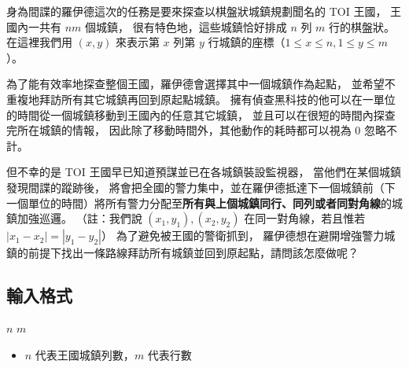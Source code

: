 身為間諜的羅伊德這次的任務是要來探查以棋盤狀城鎮規劃聞名的 TOI 王國，
王國內一共有 \begin{math}nm\end{math} 個城鎮，
很有特色地，這些城鎮恰好排成 \begin{math}n\end{math} 列
\begin{math}m\end{math} 行的棋盤狀。 在這裡我們用
\begin{math}(x, y)\end{math} 來表示第 \begin{math}x\end{math} 列第
\begin{math}y\end{math}
行城鎮的座標（\begin{math}1 \le x \le n, 1 \le y \le m\end{math}）。

為了能有效率地探查整個王國，羅伊德會選擇其中一個城鎮作為起點，
並希望不重複地拜訪所有其它城鎮再回到原起點城鎮。
擁有偵查黑科技的他可以在一單位的時間從一個城鎮移動到王國內的任意其它城鎮，
並且可以在很短的時間內探查完所在城鎮的情報，
因此除了移動時間外，其他動作的耗時都可以視為 \begin{math}0\end{math}
忽略不計。

但不幸的是 TOI 王國早已知道預謀並已在各城鎮裝設監視器，
當他們在某個城鎮發現間諜的蹤跡後，
將會把全國的警力集中，並在羅伊德抵達下一個城鎮前（下一個單位的時間）將所有警力分配至\textbf{所有與上個城鎮同行、同列或者同對角線}的城鎮加強巡邏。
（註：我們說 \begin{math}(x_1, y_1), (x_2, y_2)\end{math}
在同一對角線，若且惟若 \begin{math}|x_1 - x_2| = |y_1 - y_2|\end{math}）
為了避免被王國的警衛抓到，
羅伊德想在避開增強警力城鎮的前提下找出一條路線拜訪所有城鎮並回到原起點，請問該怎麼做呢？

\subsection{輸入格式}

\begin{format}
\f{
$n$ $m$
}
\end{format}

\begin{itemize}
\tightlist
\item
  \begin{math}n\end{math} 代表王國城鎮列數，\begin{math}m\end{math}
  代表行數
\end{itemize}


